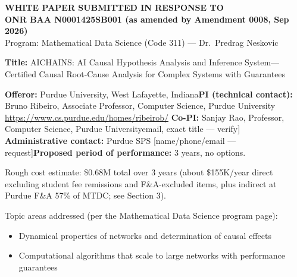 \documentclass[12pt]{article}
\begin{document}
\thispagestyle{empty} \begin{center} \textbf{WHITE PAPER SUBMITTED IN RESPONSE TO}\\[4pt]
\textbf{ONR BAA N0001425SB001 (as amended by Amendment 0008, Sep 2026)}\\[4pt]
Program: Mathematical Data Science (Code 311) --- Dr.~Predrag Neskovic \end{center}

\vspace{0.6in}

\noindent\textbf{Title:} AICHAINS: AI Causal Hypothesis Analysis and Inference System---Certified Causal Root-Cause Analysis for Complex Systems with Guarantees

\vspace{0.25in}

\noindent\textbf{Offeror:} Purdue University, West Lafayette, Indiana\newline \textbf{PI (technical contact):} Bruno Ribeiro, Associate Professor, Computer Science, Purdue University \textbar{} \url{https://www.cs.purdue.edu/homes/ribeirob/} \newline \textbf{Co-PI:} Sanjay Rao, Professor, Computer Science, Purdue University\newline {[}email, exact title --- verify{]} \newline \textbf{Administrative contact:} Purdue SPS {[}name/phone/email --- request{]}\newline \textbf{Proposed period of performance:} 3 years, no options.

\vspace{0.25in}

\noindent Rough cost estimate: \$0.68M total over 3 years (about \$155K/year direct excluding student fee remissions and F\&A-excluded items, plus indirect at Purdue F\&A 57\% of MTDC; see Section 3).

\vspace{0.25in}

\noindent Topic areas addressed (per the Mathematical Data Science program page): \begin{itemize} \item Dynamical properties of networks and determination of causal effects \item Computational algorithms that scale to large networks with performance guarantees \end{itemize}
\end{document}
